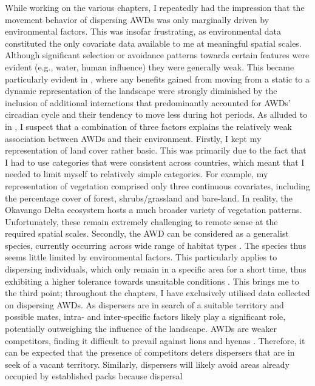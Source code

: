 \documentclass[../FinalThesis.tex]{subfiles}
\begin{document}
While working on the various chapters, I repeatedly had the impression that the
movement behavior of dispersing AWDs was only marginally driven by environmental
factors. This was insofar frustrating, as environmental data constituted the
only covariate data available to me at meaningful spatial scales. Although
significant selection or avoidance patterns towards certain features were
evident (e.g., water, human influence) they were generally weak. This became
particularly evident in , where any benefits gained
from moving from a static to a dynamic representation of the landscape were
strongly diminished by the inclusion of additional interactions that
predominantly accounted for AWDs' circadian cycle and their tendency to move
less during hot periods. As alluded to in , I suspect
that a combination of three factors explains the relatively weak association
between AWDs and their environment. Firstly, I kept my representation of land
cover rather basic. This was primarily due to the fact that I had to use
categories that were consistent across countries, which meant that I needed to
limit myself to relatively simple categories. For example, my representation of
vegetation comprised only three continuous covariates, including the percentage
cover of forest, shrubs/grassland and bare-land. In reality, the Okavango Delta
ecosystem hosts a much broader variety of vegetation patterns. Unfortunately,
these remain extremely challenging to remote sense at the required spatial
scales. Secondly, the AWD can be considered as a generalist species, currently
occurring across wide range of habitat types \citep{Woodroffe.2020}. The species
thus seems little limited by environmental factors. This particularly applies to
dispersing individuals, which only remain in a specific area for a short time,
thus exhibiting a higher tolerance towards unsuitable conditions
\citep{ONeill.2020}. This brings me to the third point; throughout the chapters,
I have exclusively utilised data collected on dispersing AWDs. As dispersers are
in search of a suitable territory and possible mates, intra- and inter-specific
factors likely play a significant role, potentially outweighing the influence of
the landscape. AWDs are weaker competitors, finding it difficult to prevail
against lions and hyenas \citep{Creel.1996, Creel.2002, Droge.2017,
Marneweck.2022}. Therefore, it can be expected that the presence of competitors
deters dispersers that are in seek of a vacant territory. Similarly, dispersers
will likely avoid areas already occupied by established packs because dispersal
\end{document}
